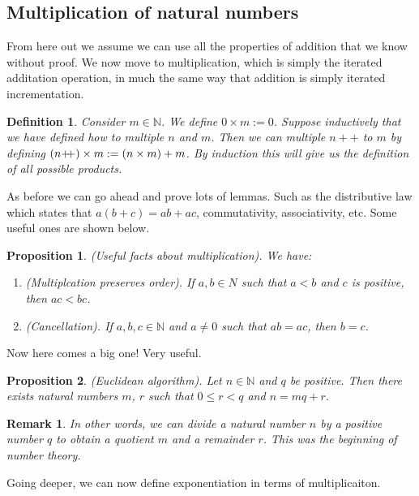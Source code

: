 \documentclass{article}
\newtheorem{definition}{Definition}[subsection]
\newtheorem{remark}{Remark}[subsection]
\newtheorem{proposition}{Proposition}[subsection]
\newcommand{\N}{\mathbb{N}}
\newcommand{\pp}{\mathbin{+\mkern-5mu+}}
\begin{document}
\subsection{Multiplication of natural numbers}

From here out we assume we can use all the properties of addition that 
we know without proof. We now move to multiplication, which is simply 
the iterated additation operation, in much the same way that addition
is simply iterated incrementation.

\begin{definition}
	Consider $m\in\N$. We define $0 \times m := 0$. Suppose 
	inductively that we have defined how to multiple $n$ and $m$. 
	Then we can multiple $n++$ to $m$ by defining $(n\pp)
	\times m := (n \times m) + m$. By induction this will give us
	the definition of all possible products.
\end{definition}

As before we can go ahead and prove lots of lemmas. Such as 
the distributive law which states that $a(b+c) = ab + ac$, 
commutativity, associativity, etc. Some useful ones are shown 
below.

\begin{proposition}
	(Useful facts about multiplication). We have:	

	\begin{enumerate}
		\item (Multiplcation preserves order). If $a,b \in N$ such  
		that $a < b$ and $c$ is positive, then $ac < bc$.
		\item (Cancellation). If $a,b,c \in \N$ and $a \neq 0$ such that
		$ab = ac$, then $b = c$.
	\end{enumerate}
\end{proposition}

Now here comes a big one! Very useful. 

\begin{proposition}
	(Euclidean algorithm). Let $n\in\N$ and $q$ be positive. Then there 
	exists natural numbers $m$, $r$ such that $0 \leq r < q$ and $n = mq + r$.
\end{proposition}

\begin{remark}
	In other words, we can divide a natural number $n$ by 
	a positive number $q$ to obtain a quotient $m$ and a remainder $r$.
	This was the beginning of \emph{number theory}.
\end{remark}

Going deeper, we can now define exponentiation in terms of multiplicaiton.
\end{document}
